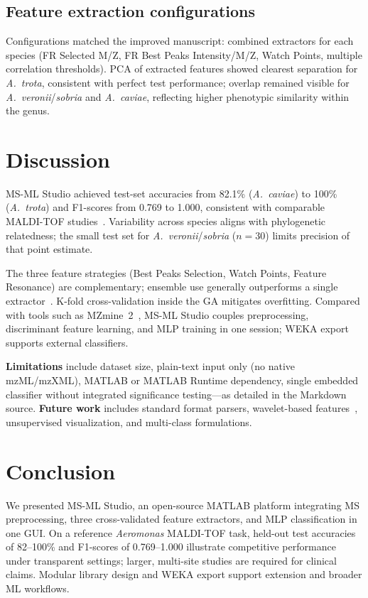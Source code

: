 \documentclass[preprint,12pt]{elsarticle}
\begin{document}
\subsection{Feature extraction configurations}
Configurations matched the improved manuscript: combined extractors for each species (FR Selected M/Z, FR Best Peaks Intensity/M/Z, Watch Points, multiple correlation thresholds). PCA of extracted features showed clearest separation for \textit{A.~trota}, consistent with perfect test performance; overlap remained visible for \textit{A.~veronii}/\textit{sobria} and \textit{A.~caviae}, reflecting higher phenotypic similarity within the genus.

\section{Discussion}

MS-ML Studio achieved test-set accuracies from 82.1\% (\textit{A.~caviae}) to 100\% (\textit{A.~trota}) and F1-scores from 0.769 to 1.000, consistent with comparable MALDI-TOF studies~\cite{Bohme2010,Croxatto2012}. Variability across species aligns with phylogenetic relatedness; the small test set for \textit{A.~veronii}/\textit{sobria} ($n=30$) limits precision of that point estimate.

The three feature strategies (Best Peaks Selection, Watch Points, Feature Resonance) are complementary; ensemble use generally outperforms a single extractor~\cite{Liu2013}. K-fold cross-validation inside the GA mitigates overfitting. Compared with tools such as MZmine~2~\cite{Pluskal2010}, MS-ML Studio couples preprocessing, discriminant feature learning, and MLP training in one session; WEKA export supports external classifiers.

\textbf{Limitations} include dataset size, plain-text input only (no native mzML/mzXML), MATLAB or MATLAB Runtime dependency, single embedded classifier without integrated significance testing---as detailed in the Markdown source. \textbf{Future work} includes standard format parsers, wavelet-based features~\cite{Liu2013}, unsupervised visualization, and multi-class formulations.

\section{Conclusion}
We presented MS-ML Studio, an open-source MATLAB platform integrating MS preprocessing, three cross-validated feature extractors, and MLP classification in one GUI. On a reference \textit{Aeromonas} MALDI-TOF task, held-out test accuracies of 82--100\% and F1-scores of 0.769--1.000 illustrate competitive performance under transparent settings; larger, multi-site studies are required for clinical claims. Modular library design and WEKA export support extension and broader ML workflows.
\end{document}

